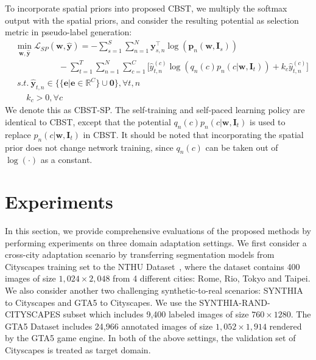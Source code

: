 \documentclass[runningheads]{llncs}
\begin{document}
To incorporate spatial priors into proposed CBST, we multiply the softmax output with the spatial priors, and consider the resulting potential as selection metric in pseudo-label generation:
\begin{equation}\label{cbst-sp}
\begin{aligned}
& \min_{\mathbf{w},\hat{\mathbf{y}}}\mathcal{L}_{SP}(\mathbf{w},\hat{\mathbf{y}}) = -\sum_{s=1}^{S}\sum_{n=1}^{N}\mathbf{y}_{s,n}^\top\log (\mathbf{p}_n(\mathbf{w},\mathbf{I}_s))\\
& ~~~~~~~~~~~~~~~~~~~~~~~-\sum_{t=1}^T\sum_{n=1}^N\sum_{c=1}^C\big[\hat{y}_{t,n}^{(c)}\log(q_n(c) p_n(c|\mathbf{w},\mathbf{I}_t))+k_c\hat{y}_{t,n}^{(c)}\big] \\
& ~s.t. ~ \hat{\mathbf{y}}_{t,n} \in \{\{\mathbf{e}|\mathbf{e} \in \mathbb{R}^C\} \cup \mathbf{0}\}, \forall t,n\\
&~~~~~~k_c > 0, \forall c
\end{aligned}
\end{equation}
We denote this as CBST-SP. The self-training and self-paced learning policy are identical to CBST, except that the potential $q_n(c)p_n(c|\mathbf{w},\mathbf{I}_t)$ is used to replace $p_n(c|\mathbf{w},\mathbf{I}_t)$ in CBST. It should be noted that incorporating the spatial prior does not change network training, since $q_n(c)$ can be taken out of $\log(\cdot)$ as a constant.



\section{Experiments}
In this section, we provide comprehensive evaluations of the proposed methods by performing experiments on three domain adaptation settings. We first consider a cross-city adaptation scenario by transferring segmentation models from Cityscapes training set to the NTHU Dataset~\cite{Chen_2017_ICCV}, where the dataset contains 400 images of size $1,024\times 2,048$ from 4 different cities: Rome, Rio, Tokyo and Taipei. We also consider another two challenging synthetic-to-real scenarios: SYNTHIA~\cite{ros2016synthia} to Cityscapes and GTA5 \cite{richter2016playing} to Cityscapes. We use the SYNTHIA-RAND-CITYSCAPES subset which includes 9,400 labeled images of size $760\times 1280$. The GTA5 Dataset includes 24,966 annotated images of size $1,052 \times 1,914$ rendered by the GTA5 game engine. In both of the above settings, the validation set of Cityscapes is treated as target domain.
\end{document}
